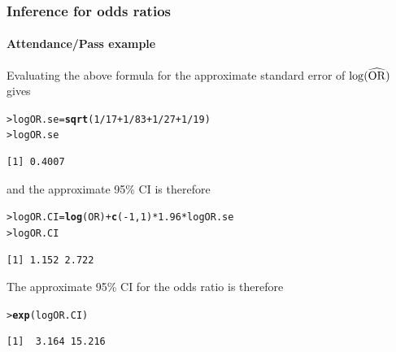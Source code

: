 \documentclass{beamer}\usepackage[]{graphicx}\usepackage[]{xcolor}
\makeatletter
\newcommand{\hlnum}[1]{\textcolor[rgb]{0.686,0.059,0.569}{#1}}%
\newcommand{\hlopt}[1]{\textcolor[rgb]{0,0,0}{#1}}%
\newcommand{\hlstd}[1]{\textcolor[rgb]{0.345,0.345,0.345}{#1}}%
\newcommand{\hlkwb}[1]{\textcolor[rgb]{0.69,0.353,0.396}{#1}}%
\newcommand{\hlkwd}[1]{\textcolor[rgb]{0.737,0.353,0.396}{\textbf{#1}}}%
\newenvironment{kframe}{%
 \def\at@end@of@kframe{}%
 \ifinner\ifhmode%
  \def\at@end@of@kframe{\end{minipage}}%
  \begin{minipage}{\columnwidth}%
 \fi\fi%
 \def\FrameCommand##1{\hskip\@totalleftmargin \hskip-\fboxsep
 \colorbox{shadecolor}{##1}\hskip-\fboxsep
     \hskip-\linewidth \hskip-\@totalleftmargin \hskip\columnwidth}%
 \MakeFramed {\advance\hsize-\width
   \@totalleftmargin\z@ \linewidth\hsize
   \@setminipage}}%
 {\par\unskip\endMakeFramed%
 \at@end@of@kframe}
\newenvironment{knitrout}{}{} %
\makeatother
\begin{document}
\begin{frame}[fragile]
\frametitle{Inference for odds ratios}
\framesubtitle{Attendance/Pass example}

Evaluating the above formula for the approximate standard error of $\log(\widehat{\operatorname{OR}})$ gives

\begin{knitrout}\scriptsize
{}\color{fgcolor}\begin{kframe}
\begin{alltt}
\hlstd{> }\hlstd{logOR.se}\hlkwb{=}\hlkwd{sqrt}\hlstd{(}\hlnum{1}\hlopt{/}\hlnum{17}\hlopt{+}\hlnum{1}\hlopt{/}\hlnum{83}\hlopt{+}\hlnum{1}\hlopt{/}\hlnum{27}\hlopt{+}\hlnum{1}\hlopt{/}\hlnum{19}\hlstd{)}
\hlstd{> }\hlstd{logOR.se}
\end{alltt}
\begin{verbatim}
[1] 0.4007
\end{verbatim}
\end{kframe}
\end{knitrout}
\medskip

and the approximate 95\% CI is therefore
\begin{knitrout}\scriptsize
{}\color{fgcolor}\begin{kframe}
\begin{alltt}
\hlstd{> }\hlstd{logOR.CI}\hlkwb{=}\hlkwd{log}\hlstd{(OR)} \hlopt{+} \hlkwd{c}\hlstd{(}\hlopt{-}\hlnum{1}\hlstd{,}\hlnum{1}\hlstd{)}\hlopt{*}\hlnum{1.96}\hlopt{*}\hlstd{logOR.se}
\hlstd{> }\hlstd{logOR.CI}
\end{alltt}
\begin{verbatim}
[1] 1.152 2.722
\end{verbatim}
\end{kframe}
\end{knitrout}
\medskip

The approximate 95\% CI for the odds ratio is therefore

\begin{knitrout}\scriptsize
{}\color{fgcolor}\begin{kframe}
\begin{alltt}
\hlstd{> }\hlkwd{exp}\hlstd{(logOR.CI)}
\end{alltt}
\begin{verbatim}
[1]  3.164 15.216
\end{verbatim}
\end{kframe}
\end{knitrout}
\medskip


\end{frame}
\end{document}

